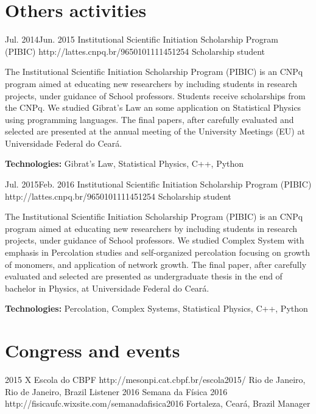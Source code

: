 \documentclass[10pt]{article} %
\begin{document}
\section{Others activities}

\job
{Jul. 2014}{Jun. 2015}
{Institutional Scientific Initiation Scholarship Program (PIBIC)}
{http://lattes.cnpq.br/9650101111451254}
{Scholarship student}
{The Institutional Scientific Initiation Scholarship Program (PIBIC) is an CNPq program aimed at educating new researchers by including students in research projects, under guidance of School professors. Students receive scholarships from the CNPq. We studied Gibrat's Law an some application on Statistical Physics using programming languages. The final papers, after carefully evaluated and selected are presented at the annual meeting of the University Meetings (EU) at Universidade Federal do Ceará. \\
\rule{0mm}{5mm}\textbf{Technologies:} Gibrat's Law, Statistical Physics, C++, Python}


\job
{Jul. 2015}{Feb. 2016}
{Institutional Scientific Initiation Scholarship Program (PIBIC)}
{http://lattes.cnpq.br/9650101111451254}
{Scholarship student}
{The Institutional Scientific Initiation Scholarship Program (PIBIC) is an CNPq program aimed at educating new researchers by including students in research projects, under guidance of School professors. We studied Complex System with emphasis in Percolation studies and self-organized percolation focusing on growth of monomers, and application of network growth. The final paper, after carefully evaluated and selected are presented as undergraduate thesis in the end of bachelor in Physics, at Universidade Federal do Ceará. \\
\rule{0mm}{5mm}\textbf{Technologies:} Percolation, Complex Systems, Statistical Physics, C++, Python}


\section{Congress and events}

\job
{2015}{}
{X Escola do CBPF}
{http://mesonpi.cat.cbpf.br/escola2015/}
{Rio de Janeiro, Rio de Janeiro, Brazil}
{Listener}
\job
{2016}{}
{Semana da Física 2016}
{http://fisicaufc.wixsite.com/semanadafisica2016}
{Fortaleza, Ceará, Brazil}
{Manager}
\end{document}
